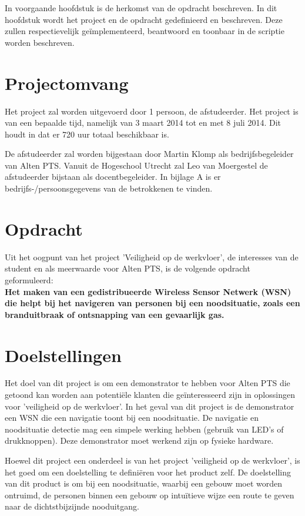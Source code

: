 \documentclass{../local}
\begin{document}
In voorgaande hoofdstuk is de herkomst van de  opdracht beschreven. In dit hoofdstuk wordt het project en de opdracht gedefinieerd en beschreven.  Deze zullen respectievelijk geïmplementeerd, beantwoord en toonbaar in de scriptie worden beschreven. 

\section{Projectomvang}
Het project zal worden uitgevoerd door 1 persoon, de afstudeerder. Het project is van een bepaalde tijd, namelijk van 3 maart 2014 tot en met 8 juli 2014. Dit houdt in dat er 720 uur totaal beschikbaar is.

De afstudeerder zal worden bijgestaan door Martin Klomp als bedrijfsbegeleider van Alten PTS. Vanuit de Hogeschool Utrecht zal Leo van Moergestel de afstudeerder bijstaan als docentbegeleider. In bijlage A is er bedrijfs-/persoonsgegevens van de betrokkenen te vinden.

\section{Opdracht}
Uit het oogpunt van het project 'Veiligheid op de werkvloer', de interesses van de student en als meerwaarde voor Alten PTS, is de volgende opdracht geformuleerd: \\
\textbf{Het maken van een gedistribueerde Wireless Sensor Netwerk (WSN) die helpt bij het navigeren van personen bij een noodsituatie, zoals een branduitbraak of ontsnapping van een gevaarlijk gas.}

\section{Doelstellingen}
Het doel van dit project is om een demonstrator te hebben voor Alten PTS die getoond kan worden aan potentiële klanten die geïnteresseerd zijn in oplossingen voor 'veiligheid op de werkvloer'. In het geval van dit project is de demonstrator een WSN die een navigatie toont bij een noodsituatie. De navigatie en noodsituatie detectie mag een simpele werking hebben (gebruik van LED's of drukknoppen). Deze demonstrator moet werkend zijn op fysieke hardware. 

Hoewel dit project een onderdeel is van het project 'veiligheid op de werkvloer', is het goed om een doelstelling te definiëren voor het product zelf. De doelstelling van dit product is om bij een noodsituatie, waarbij een gebouw moet worden ontruimd, de personen binnen een gebouw op intuïtieve wijze een route te geven naar de dichtstbijzijnde nooduitgang.
\end{document}
